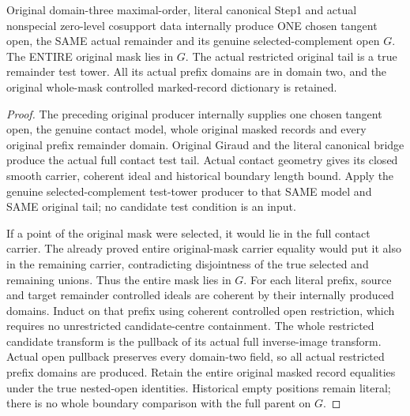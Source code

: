 \begin{theorem}
\label{hir:zero-contact-original-remainder-test-tower}
\leanok
{}
Original domain-three maximal-order, literal canonical Step1 and actual
nonspecial zero-level cosupport data internally produce ONE chosen tangent
open, the SAME actual remainder and its genuine selected-complement open $G$.
The ENTIRE original mask lies in $G$. The actual restricted original tail is
a true remainder test tower. All its actual prefix domains are in domain two,
and the original whole-mask controlled marked-record dictionary is retained.
\end{theorem}
\begin{proof}
The preceding original producer internally supplies one chosen tangent open,
the genuine contact model, whole original masked records and every original
prefix remainder domain. Original Giraud and the literal canonical bridge
produce the actual full contact test tail. Actual contact geometry gives its
closed smooth carrier, coherent ideal and historical boundary length bound.
Apply the genuine selected-complement test-tower producer to that SAME model
and SAME original tail; no candidate test condition is an input.

If a point of the original mask were selected, it would lie in the full
contact carrier. The already proved entire original-mask carrier equality
would put it also in the remaining carrier, contradicting disjointness of
the true selected and remaining unions. Thus the entire mask lies in $G$.
For each literal prefix, source and target remainder controlled ideals are
coherent by their internally produced domains. Induct on that prefix using
coherent controlled open restriction, which requires no unrestricted
candidate-centre containment. The whole restricted candidate transform is
the pullback of its actual full inverse-image transform. Actual open pullback
preserves every domain-two field, so all actual restricted prefix domains
are produced. Retain the entire original masked record equalities under the
true nested-open identities. Historical empty positions remain literal;
there is no whole boundary comparison with the full parent on $G$.
\end{proof}

